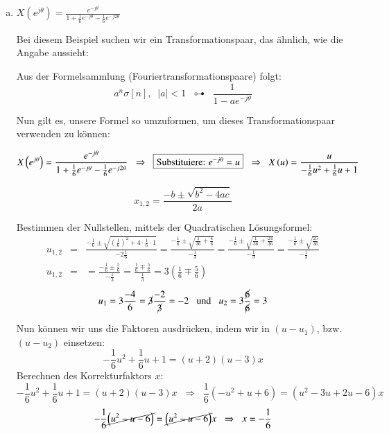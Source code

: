\begin{uebsp}
\begin{Answer}
\begin{enumerate}[a)]
    \item $\displaystyle X\left(e^{j\theta}\right) =
        \frac{e^{-j\theta}}{1+\frac{1}{6}e^{-j\theta}-\frac{1}{6}e^{-j2\theta}}$

        Bei diesem Beispiel suchen wir ein Transformationspaar, das ähnlich, wie
        die Angabe aussieht:
        \begin{uebsp_theory}
            Aus der Formelsammlung (Fouriertransformationspaare) folgt:
            \[a^n\sigma[n],\;\;|a|<1\;\;\multimapdotbothA\;\;\frac{1}{1-ae^{-j\theta}}\]
        \end{uebsp_theory}
        Nun gilt es, unsere Formel so umzuformen, um dieses Transformationspaar
        verwenden zu können:

        \[X\left(e^{j\theta}\right) =
        \frac{e^{-j\theta}}{1+\frac{1}{6}e^{-j\theta}-\frac{1}{6}e^{-j2\theta}}\;\;\Rightarrow\;\;\fbox{Substituiere:
    $e^{-j\theta}=u$}\;\;\Rightarrow\;\;X\left(u\right) =
        \frac{u}{-\frac{1}{6}u^2+\frac{1}{6}u+1}\]

        \begin{definition}
            \[x_{1,2}=\frac{-b\pm\sqrt{b^2-4ac}}{2a}\]
        \end{definition}

        Bestimmen der Nullstellen, mittels der Quadratischen Lösungsformel:
        \begin{eqnarray*}
            u_{1,2}&=&\frac{-\frac{1}{6}\pm\sqrt{\left(\frac{1}{6}\right)^2+
                4\cdot\frac{1}{6}\cdot 1}}{-2\frac{1}{6}}
            =\frac{-\frac{1}{6}\pm\sqrt{\frac{1}{36}+
                \frac{4}{6}}}{-\frac{1}{3}}
            =\frac{-\frac{1}{6}\pm\sqrt{\frac{1}{36}+
                \frac{24}{36}}}{-\frac{1}{3}}
            =\frac{-\frac{1}{6}\pm\sqrt{\frac{25}{36}}}{-\frac{1}{3}}\\
            u_{1,2}&=&=\frac{-\frac{1}{6}\pm\frac{5}{6}}{-\frac{1}{3}}
            =\frac{\frac{1}{6}\mp\frac{5}{6}}{\frac{1}{3}}
            =3\left(\frac{1}{6}\mp\frac{5}{6}\right)
        \end{eqnarray*}
        \[u_1=3\frac{-4}{6}=\cancel3\frac{-2}{\cancel3}=-2\;\;\text{ und
        }\;\;u_2=3\frac{\cancel 6}{\cancel 6}=3\]

        Nun können wir uns die Faktoren ausdrücken, indem wir in $(u-u_1)$, bzw.
        $(u-u_2)$ einsetzen: 
        \[-\frac{1}{6}u^2+\frac{1}{6}u+1=(u+2)(u-3)x\]
        Berechnen des Korrekturfaktors $x$:
        \[-\frac{1}{6}u^2+\frac{1}{6}u+1=(u+2)(u-3)x\;\;\Rightarrow\;\;
            \frac{1}{6}\left(-u^2+u+6\right)=\left(u^2-3u+2u-6\right)x\]
            \[-\frac{1}{6}\cancel{\left(u^2-u-6\right)}=\cancel{\left(u^2-u-6\right)}x\;\;\Rightarrow\;\;x=-\frac{1}{6}\]


\end{enumerate}
\end{Answer}
\end{uebsp}
